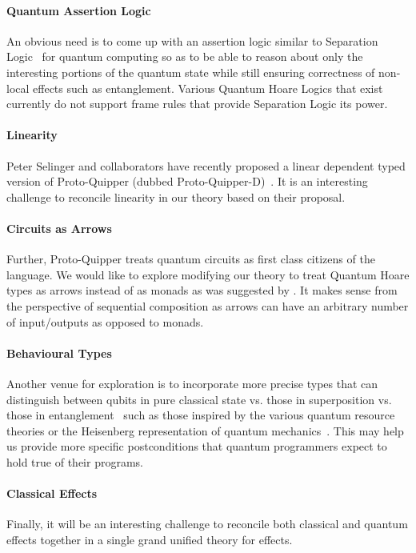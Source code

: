 \documentclass[acmsmall,nonacm,timestamp,review=false,anonymous=false]{acmart}
\begin{document}
\paragraph{Quantum Assertion Logic} An obvious need is to come up with an assertion logic similar to Separation Logic~\cite{reynolds2002} for quantum computing so as to be able to reason about only the interesting portions of the quantum state while still ensuring correctness of non-local effects such as entanglement. Various Quantum Hoare Logics that exist~\cite{ying_floydhoare_2012} currently do not support frame rules that provide Separation Logic its power.

\paragraph{Linearity} Peter Selinger and collaborators have recently proposed a linear dependent typed version of Proto-Quipper (dubbed Proto-Quipper-D)~\cite{selinger2020,fu2020linear}. It is an interesting challenge to reconcile linearity in our theory based on their proposal.

\paragraph{Circuits as Arrows} Further, Proto-Quipper treats quantum circuits as first class citizens of the language. We would like to explore modifying our theory to treat Quantum Hoare types as arrows instead of as monads as was suggested by \citet{so-arrows}. It makes sense from the perspective of sequential composition as arrows can have an arbitrary number of input/outputs as opposed to monads.

\paragraph{Behavioural Types} Another venue for exploration is to incorporate more precise types that can distinguish between qubits in pure classical state vs. those in superposition vs. those in entanglement~\cite{JorrandPerdrix2009} such as those inspired by the various quantum resource theories or the Heisenberg representation of quantum mechanics~\cite{rand_type_2019,rssl20}. This may help us provide more specific postconditions that quantum programmers expect to hold true of their programs.

\paragraph{Classical Effects} Finally, it will be an interesting challenge to reconcile both classical and quantum effects together in a single grand unified theory for effects.
\end{document}
